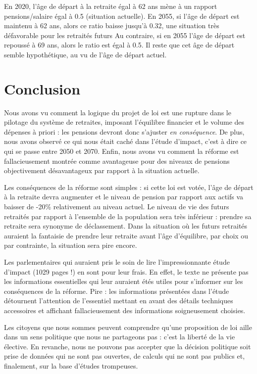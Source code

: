 \documentclass[10pt]{article}
\begin{document}
En 2020, l'âge de départ à la retraite égal à 62 ans 
mène à un rapport pensions/salaire égal à 0.5 (situation actuelle).  
En 2055, si l'âge de départ est maintenu à 62 ans, alors ce ratio baisse jusqu'à 0.32, 
une situation très défavorable pour les retraités futurs
Au contraire, si en 2055 l'âge de départ est repoussé à 69 ans, 
alors le ratio est égal à 0.5. 
Il reste que cet âge de départ semble hypothétique, au vu de l'âge de départ actuel. 


\section{Conclusion}

Nous avons vu comment la logique du projet de loi est une 
rupture dans le pilotage du système de retraites, 
imposant l'équilibre financier et le volume des dépenses 
à priori : les pensions devront donc s'ajuster \emph{en conséquence}. 
De plus, nous avons observé ce qui nous était caché dans l'étude 
d'impact, c'est à dire ce qui se passe entre 2050 et 2070. 
Enfin, nous avons vu comment la réforme est fallacieusement 
montrée comme avantageuse pour des niveaux de pensions 
objectivement désavantageux par rapport à la situation 
actuelle. 

Les conséquences de la réforme sont simples : 
si cette loi est votée, l'âge de départ à la retraite 
devra augmenter et le niveau de pension par rapport aux actifs va 
baisser de -20\% relativement au niveau actuel. 
Le niveau de vie des futurs retraités par rapport à l'ensemble de la 
population sera très inférieur : prendre sa retraite sera synonyme de 
déclassement. 
Dans la situation où les futurs retraités auraient la fantaisie 
de prendre leur retraite avant l'âge d'équilibre, par choix ou par contrainte, 
la situation sera pire encore. 

Les parlementaires qui auraient pris le soin de lire l'impressionnante 
étude d'impact (1029 pages !) en sont pour leur frais. 
En effet, le texte ne présente pas les informations essentielles qui leur auraient étés 
utiles pour s'informer sur les conséquences de la réforme. 
Pire : les informations présentées dans l'étude détournent l'attention de l'essentiel 
mettant en avant des détails techniques accessoires et affichant fallacieusement 
des informations soigneusement choisies. 

Les citoyens que nous sommes peuvent comprendre qu'une proposition de loi 
aille dans un sens politique que nous ne partageons pas : c'est la 
liberté de la vie élective. 
En revanche, nous ne pouvons pas accepter que la décision politique soit 
prise de données qui ne sont pas ouvertes, 
de calculs qui ne sont pas publics et, finalement, sur la base d'études trompeuses. 
\end{document}
